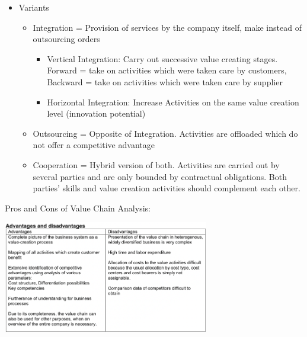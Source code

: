 \documentclass[9pt, landscape, fleqn]{scrartcl}
\begin{document}
\begin{multicols*}{3}
\begin{itemize}
    \item Variants
    \begin{itemize}
        \item Integration = Provision of services by the company itself, make instead of outsourcing orders 
        \begin{itemize}
            \item Vertical Integration: Carry out successive value creating stages. Forward = take on activities which were taken care by customers, Backward = take on activities which were taken care by supplier
            \item Horizontal Integration: Increase Activities on the same value creation level (innovation potential)
        \end{itemize}
        \item Outsourcing = Opposite of Integration. Activities are offloaded which do not offer a competitive advantage 
        \item Cooperation = Hybrid version of both. Activities are carried out by several parties and are only bounded by contractual obligations. Both parties' skills and value creation activities should complement each other.
    \end{itemize}
\end{itemize}
Pros and Cons of Value Chain Analysis:
\begin{center}
    \includegraphics[width=9cm]{Images/Value Creation - Pros and Cons.png}
\end{center}
\newpage

\end{multicols*}
\end{document}
